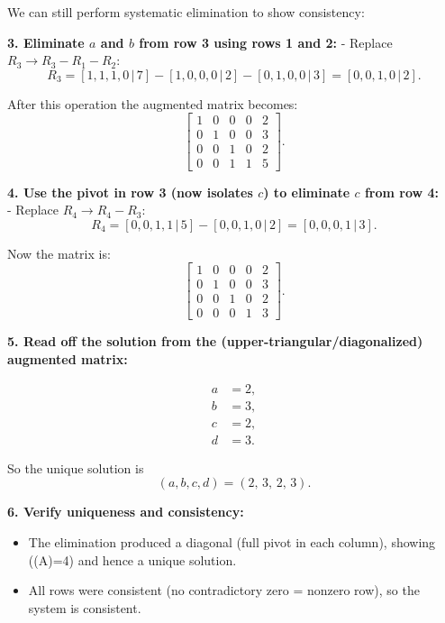 \documentclass[
  letterpaper,
  DIV=11,
  numbers=noendperiod]{scrreprt}
\providecommand{\tightlist}{%
  \setlength{\itemsep}{0pt}\setlength{\parskip}{0pt}}
\begin{document}
We can still perform systematic elimination to show consistency:

\textbf{3. Eliminate \(a\) and \(b\) from row 3 using rows 1 and 2:} -
Replace \(R_3 \to R_3 - R_1 - R_2\): \[
R_3 = [1,1,1,0\,|\,7] - [1,0,0,0\,|\,2] - [0,1,0,0\,|\,3] = [0,0,1,0\,|\,2].
\]

After this operation the augmented matrix becomes: \[
\left[\begin{array}{cccc|c}
1 & 0 & 0 & 0 & 2\\[4pt]
0 & 1 & 0 & 0 & 3\\[4pt]
0 & 0 & 1 & 0 & 2\\[4pt]
0 & 0 & 1 & 1 & 5
\end{array}\right].
\]

\textbf{4. Use the pivot in row 3 (now isolates \(c\)) to eliminate
\(c\) from row 4:}\\
- Replace \(R_4 \to R_4 - R_3\): \[
R_4 = [0,0,1,1\,|\,5] - [0,0,1,0\,|\,2] = [0,0,0,1\,|\,3].
\]

Now the matrix is: \[
\left[\begin{array}{cccc|c}
1 & 0 & 0 & 0 & 2\\[4pt]
0 & 1 & 0 & 0 & 3\\[4pt]
0 & 0 & 1 & 0 & 2\\[4pt]
0 & 0 & 0 & 1 & 3
\end{array}\right].
\]

\textbf{5. Read off the solution from the
(upper-triangular/diagonalized) augmented matrix:}

\[
\begin{aligned}
a &= 2,\\
b &= 3,\\
c &= 2,\\
d &= 3.
\end{aligned}
\]

So the unique solution is \[
(a,b,c,d) = (2,\,3,\,2,\,3).
\]

\textbf{6. Verify uniqueness and consistency:}

\begin{itemize}
\tightlist
\item
  The elimination produced a diagonal (full pivot in each column),
  showing ((A)=4) and hence a unique solution.\\
\item
  All rows were consistent (no contradictory zero = nonzero row), so the
  system is consistent.
\end{itemize}
\end{document}
